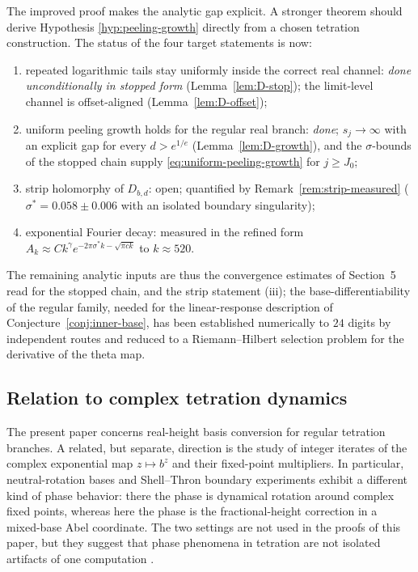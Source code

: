 \documentclass[11pt,a4paper]{article}
\theoremstyle{plain}
\theoremstyle{definition}
\theoremstyle{remark}
\begin{document}
The improved proof makes the analytic gap explicit.  A stronger theorem should derive Hypothesis \ref{hyp:peeling-growth} directly from a chosen tetration construction.  The status of the four target statements is now:
\begin{enumerate}[label=(\roman*),leftmargin=2em]
  \item repeated logarithmic tails stay uniformly inside the correct real channel: \emph{done unconditionally in stopped form} (Lemma~\ref{lem:D-stop}); the limit-level channel is offset-aligned (Lemma~\ref{lem:D-offset});
  \item uniform peeling growth holds for the regular real branch: \emph{done}; $s_j\to\infty$ with an explicit gap for every $d>e^{1/e}$ (Lemma~\ref{lem:D-growth}), and the $\sigma$-bounds of the stopped chain supply \eqref{eq:uniform-peeling-growth} for $j\ge J_0$;
  \item strip holomorphy of $D_{b,d}$: open; quantified by Remark~\ref{rem:strip-measured} ($\sigma^*=0.058\pm0.006$ with an isolated boundary singularity);
  \item exponential Fourier decay: measured in the refined form $A_k\approx C k^{\gamma}e^{-2\pi\sigma^*k-\sqrt{\pi ck}}$ to $k\approx520$.
\end{enumerate}
The remaining analytic inputs are thus the convergence estimates of Section~5 read for the stopped chain, and the strip statement (iii); the base-differentiability of the regular family, needed for the linear-response description of Conjecture~\ref{conj:inner-base}, has been established numerically to $24$ digits by independent routes and reduced to a Riemann--Hilbert selection problem for the derivative of the theta map.

\subsection{Relation to complex tetration dynamics}

The present paper concerns real-height basis conversion for regular tetration branches.  A related, but separate, direction is the study of integer iterates of the complex exponential map $z\mapsto b^z$ and their fixed-point multipliers.  In particular, neutral-rotation bases and Shell--Thron boundary experiments exhibit a different kind of phase behavior: there the phase is dynamical rotation around complex fixed points, whereas here the phase is the fractional-height correction in a mixed-base Abel coordinate.  The two settings are not used in the proofs of this paper, but they suggest that phase phenomena in tetration are not isolated artifacts of one computation \cite{justus-complex-dynamics}.
\end{document}
